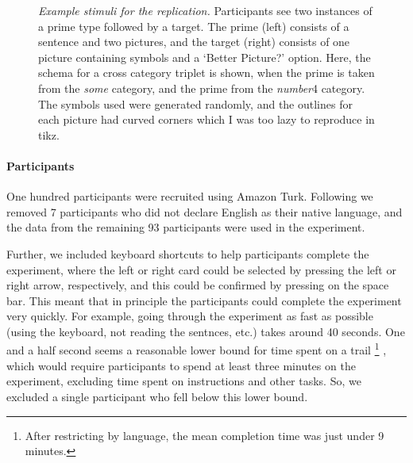 \documentclass[10pt]{article}
\begin{document}
\begin{multicols}{2}
\begin{figure}[ht]
  \caption{\emph{Example stimuli for the replication.} Participants see two instances of a prime type followed by a target.
    The prime (left) consists of a sentence and two pictures, and the target (right) consists of one picture containing symbols and a `Better Picture?' option.
    Here, the schema for a cross category triplet is shown, when the prime is taken from the \emph{some} category, and the prime from the \emph{number}4 category.
    The symbols used were generated randomly, and the outlines for each picture had curved corners which I was too lazy to reproduce in tikz.
  }
\end{figure}


\paragraph{Participants}

One hundred participants were recruited using Amazon Turk.
Following \citeauthor{Bott:2016aa} we removed 7 participants who did not declare English as their native language, and the data from the remaining 93 participants were used in the experiment.

Further, we included keyboard shortcuts to help participants complete the experiment, where the left or right card could be selected by pressing the left or right arrow, respectively, and this could be confirmed by pressing on the space bar.
  This meant that in principle the participants could complete the experiment very quickly.
  For example, going through the experiment as fast as possible (using the keyboard, not reading the sentnces, etc.) takes around 40 seconds.
  One and a half second seems a reasonable lower bound for time spent on a trail\nolinebreak
  \footnote{After restricting by language, the mean completion time was just under 9 minutes.}\nolinebreak
  , which would require participants to spend at least three minutes on the experiment, excluding time spent on instructions and other tasks.
  So, we excluded a single participant who fell below this lower bound.


\end{multicols}
\end{document}
